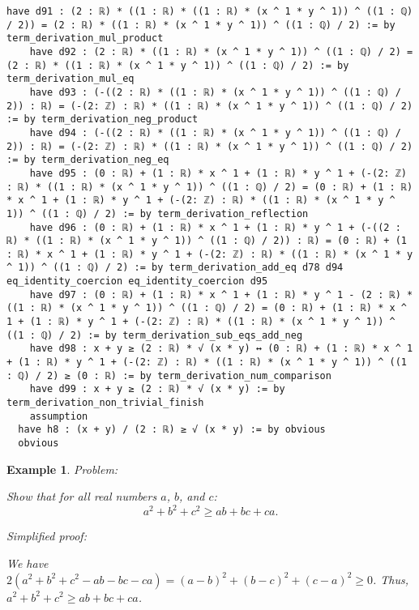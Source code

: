 \documentclass{article}
\newtheorem{example}{Example}
\begin{document}
\begin{tcolorbox}[colback=white!10, width=\linewidth]
\begin{lstlisting}[language=Lean4]
    have d91 : (2 : ℝ) * ((1 : ℝ) * ((1 : ℝ) * (x ^ 1 * y ^ 1)) ^ ((1 : ℚ) / 2)) = (2 : ℝ) * ((1 : ℝ) * (x ^ 1 * y ^ 1)) ^ ((1 : ℚ) / 2) := by term_derivation_mul_product
    have d92 : (2 : ℝ) * ((1 : ℝ) * (x ^ 1 * y ^ 1)) ^ ((1 : ℚ) / 2) = (2 : ℝ) * ((1 : ℝ) * (x ^ 1 * y ^ 1)) ^ ((1 : ℚ) / 2) := by term_derivation_mul_eq
    have d93 : (-((2 : ℝ) * ((1 : ℝ) * (x ^ 1 * y ^ 1)) ^ ((1 : ℚ) / 2)) : ℝ) = (-(2: ℤ) : ℝ) * ((1 : ℝ) * (x ^ 1 * y ^ 1)) ^ ((1 : ℚ) / 2) := by term_derivation_neg_product
    have d94 : (-((2 : ℝ) * ((1 : ℝ) * (x ^ 1 * y ^ 1)) ^ ((1 : ℚ) / 2)) : ℝ) = (-(2: ℤ) : ℝ) * ((1 : ℝ) * (x ^ 1 * y ^ 1)) ^ ((1 : ℚ) / 2) := by term_derivation_neg_eq
    have d95 : (0 : ℝ) + (1 : ℝ) * x ^ 1 + (1 : ℝ) * y ^ 1 + (-(2: ℤ) : ℝ) * ((1 : ℝ) * (x ^ 1 * y ^ 1)) ^ ((1 : ℚ) / 2) = (0 : ℝ) + (1 : ℝ) * x ^ 1 + (1 : ℝ) * y ^ 1 + (-(2: ℤ) : ℝ) * ((1 : ℝ) * (x ^ 1 * y ^ 1)) ^ ((1 : ℚ) / 2) := by term_derivation_reflection
    have d96 : (0 : ℝ) + (1 : ℝ) * x ^ 1 + (1 : ℝ) * y ^ 1 + (-((2 : ℝ) * ((1 : ℝ) * (x ^ 1 * y ^ 1)) ^ ((1 : ℚ) / 2)) : ℝ) = (0 : ℝ) + (1 : ℝ) * x ^ 1 + (1 : ℝ) * y ^ 1 + (-(2: ℤ) : ℝ) * ((1 : ℝ) * (x ^ 1 * y ^ 1)) ^ ((1 : ℚ) / 2) := by term_derivation_add_eq d78 d94 eq_identity_coercion eq_identity_coercion d95
    have d97 : (0 : ℝ) + (1 : ℝ) * x ^ 1 + (1 : ℝ) * y ^ 1 - (2 : ℝ) * ((1 : ℝ) * (x ^ 1 * y ^ 1)) ^ ((1 : ℚ) / 2) = (0 : ℝ) + (1 : ℝ) * x ^ 1 + (1 : ℝ) * y ^ 1 + (-(2: ℤ) : ℝ) * ((1 : ℝ) * (x ^ 1 * y ^ 1)) ^ ((1 : ℚ) / 2) := by term_derivation_sub_eqs_add_neg
    have d98 : x + y ≥ (2 : ℝ) * √ (x * y) ↔ (0 : ℝ) + (1 : ℝ) * x ^ 1 + (1 : ℝ) * y ^ 1 + (-(2: ℤ) : ℝ) * ((1 : ℝ) * (x ^ 1 * y ^ 1)) ^ ((1 : ℚ) / 2) ≥ (0 : ℝ) := by term_derivation_num_comparison
    have d99 : x + y ≥ (2 : ℝ) * √ (x * y) := by term_derivation_non_trivial_finish
    assumption
  have h8 : (x + y) / (2 : ℝ) ≥ √ (x * y) := by obvious
  obvious

\end{lstlisting}
\end{tcolorbox}


\begin{example}
Problem:
\begin{tcolorbox}[colback=yellow!10, width=\linewidth]
Show that for all real numbers $a$, $b$, and $c$:
    $$a^2 + b^2 + c^2 \geq ab + bc + ca.$$
\end{tcolorbox}

Simplified proof:
\begin{tcolorbox}[colback=blue!10, width=\linewidth]
We have $2(a^2 + b^2 + c^2 - ab - bc - ca) = (a-b)^2 + (b-c)^2 + (c-a)^2 \ge 0$. Thus, $a^2 + b^2 + c^2 \geq ab + bc + ca$.
\end{tcolorbox}
\end{example}
\end{document}
